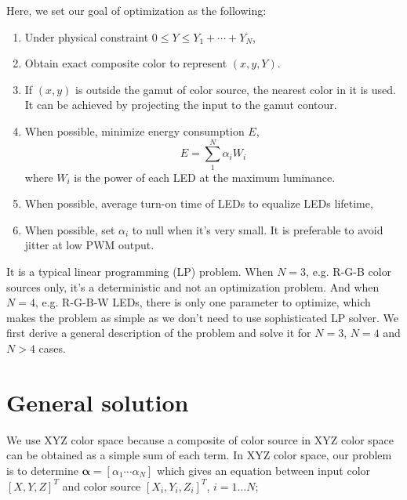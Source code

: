 \documentclass[dvipdfmx,uplatex,a4paper]{article}
\begin{document}
Here, we set our goal of optimization as the following:
\begin{enumerate}
  \item\label{I_max_luminance} Under physical constraint $0 \leq Y \leq  Y_1 + \cdots + Y_N$,
  \item\label{I_solution} Obtain exact composite color to represent $(x, y, Y)$.
  \item\label{I_inside_gamut} If $(x, y)$ is outside the gamut of color source, the nearest color in it is used.
  It can be achieved by projecting the input to the gamut contour.
  \item\label{I_min_energy} When possible, minimize energy consumption $E$, \\
  \begin{equation}
    \label{E_min_energy}
    E = \sum_1^N \alpha_i W_i
  \end{equation}
  where $W_i$ is the power of each LED at the maximum luminance.
  \item\label{I_lifetime} When possible, average turn-on time of LEDs to equalize LEDs lifetime,
  \item\label{I_small_alpha} When possible, set $\alpha_i$ to null when it's very small.
  It is preferable to avoid jitter at low PWM output.
\end{enumerate}

It is a typical linear programming (LP) problem. When $N=3$, e.g. R-G-B color sources only, it's a deterministic and not an optimization problem. And when $N=4$, e.g. R-G-B-W LEDs, there is only one parameter to optimize, which makes the problem as simple as we don't need to use sophisticated LP solver.
We first derive a general description of the problem and solve it for $N=3$, $N=4$ and $N > 4$ cases.

\section{General solution}
We use XYZ color space because a composite of color source in XYZ color space can be obtained as a simple sum of each term.  In XYZ color space, our problem is to determine $\boldsymbol{\alpha} = [\alpha_1 \cdots \alpha_N]$ which gives an equation between input color $[X, Y, Z]^T$ and color source $[X_{i}, Y_{i}, Z_{i}]^T$, $i=1 \ldots N$;
\end{document}
